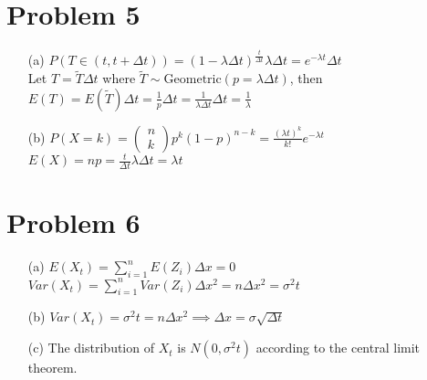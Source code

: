 \documentclass{article}
\begin{document}
\section*{Problem 5}
\begin{itemize}
	\item [(a)] $P(T\in(t,t+\Delta t))=(1-\lambda\Delta t)^\frac{t}{\Delta t}\lambda\Delta t=\boxed{e^{-\lambda t}\Delta t}$\\Let $T=\tilde{T}\Delta t$ where $\tilde{T}\sim\text{Geometric}(p=\lambda\Delta t)$, then $E(T)=E(\tilde{T})\Delta t=\frac{1}{p}\Delta t=\frac{1}{\lambda\Delta t}\Delta t=\boxed{\frac{1}{\lambda}}$
	\item [(b)] $P(X=k)=\begin{pmatrix}n\\k\end{pmatrix}p^k(1-p)^{n-k}=\frac{(\lambda t)^k}{k!}e^{-\lambda t}$\\$E(X)=np=\frac{t}{\Delta t}\lambda\Delta t=\boxed{\lambda t}$
\end{itemize}

\section*{Problem 6}
\begin{itemize}
	\item [(a)] $E(X_t)=\sum_{i=1}^nE(Z_i)\Delta x=\boxed{0}$\\$Var(X_t)=\sum_{i=1}^nVar(Z_i)\Delta x^2=n\Delta x^2=\boxed{\sigma^2t}$
	\item [(b)] $Var(X_t)=\sigma^2t=n\Delta x^2 \implies \boxed{\Delta x=\sigma\sqrt{\Delta t}}$
	\item [(c)] The distribution of $X_t$ is $\boxed{N(0,\sigma^2t)}$ according to the central limit theorem.
\end{itemize}
\end{document}
